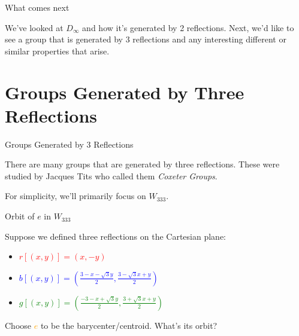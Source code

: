 \documentclass[usenames,dvipsnames]{beamer}
\begin{document}
\begin{frame}{What comes next}

We've looked at $D_\infty$ and how it's generated by 2 reflections. Next, we'd like to see a group that is
generated by 3 reflections and any interesting different or similar properties that arise.

\end{frame}


\section{Groups Generated by Three Reflections}

\begin{frame}{Groups Generated by 3 Reflections}

There are many groups that are generated by three reflections. These were studied by Jacques Tits who called them \textit{Coxeter Groups}.

For simplicity, we'll primarily focus on $W_{333}$.

\end{frame}

\begin{frame}{Orbit of $e$ in $W_{333}$}

Suppose we defined three reflections on the Cartesian plane:

\begin{itemize}
  \item \textcolor{red}{$r[(x,y)]=(x,-y)$}
  \item \textcolor{blue}{$b[(x,y)]=(\frac{3-x-\sqrt{3}y}{2},\frac{3-\sqrt{3}x+y}{2})$}
  \item \textcolor{green}{$g[(x,y)]=(\frac{-3-x+\sqrt{3}y}{2},\frac{3+\sqrt{3}x+y}{2})$}
\end{itemize}

Choose \textcolor{orange}{$e$} to be the barycenter/centroid. What's its orbit?

\end{frame}
\end{document}
